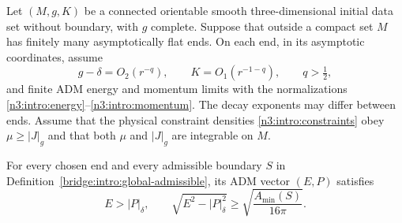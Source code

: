 \begin{theorem}
\label{bridge:intro:global-penrose}
Let $(M,g,K)$ be a connected orientable smooth three-dimensional initial
data set without boundary, with $g$ complete. Suppose that outside a
compact set $M$ has finitely many asymptotically flat ends. On each end,
in its asymptotic coordinates, assume
\[
 g-\delta=O_2(r^{-q}),\qquad K=O_1(r^{-1-q}),\qquad q>\tfrac12,
\]
and finite ADM energy and momentum limits with the normalizations
\eqref{n3:intro:energy}--\eqref{n3:intro:momentum}. The decay exponents
may differ between ends. Assume that the physical constraint densities
\eqref{n3:intro:constraints} obey $\mu\ge|J|_g$ and that both $\mu$ and
$|J|_g$ are integrable on $M$.

For every chosen end and every admissible boundary $S$ in
Definition~\ref{bridge:intro:global-admissible}, its ADM vector $(E,P)$
satisfies
\begin{equation}
\label{bridge:intro:global-inequality}
 E>|P|_\delta,\qquad
 \sqrt{E^2-|P|_\delta^2}\ge
                         \sqrt{\frac{A_{\min}(S)}{16\pi}}.
\end{equation}
\end{theorem}

